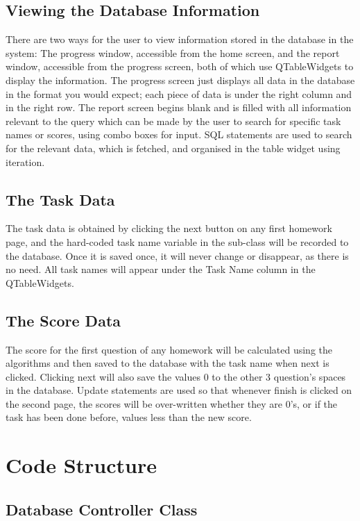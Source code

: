 \subsection{Viewing the Database Information}

There are two ways for the user to view information stored in the database in the system: The progress window, accessible from the home screen, and the report window, accessible from the progress screen, both of which use QTableWidgets to display the information. The progress screen just displays all data in the database in the format you would expect; each piece of data is under the right column and in the right row. The report screen begins blank and is filled with all information relevant to the query which can be made by the user to search for specific task names or scores, using combo boxes for input. SQL statements are used to search for the relevant data, which is fetched, and organised in the table widget using iteration.

\subsection{The Task Data}

The task data is obtained by clicking the next button on any first homework page, and the hard-coded task name variable in the sub-class will be recorded to the database. Once it is saved once, it will never change or disappear, as there is no need. All task names will appear under the Task Name column in the QTableWidgets.

\subsection{The Score Data}

The score for the first question of any homework will be calculated using the algorithms and then saved to the database with the task name when next is clicked. Clicking next will also save the values 0 to the other 3 question's spaces in the database. Update statements are used so that whenever finish is clicked on the second page, the scores will be over-written whether they are 0's, or if the task has been done before, values less than the new score.

\section{Code Structure}

\subsection{Database Controller Class}

